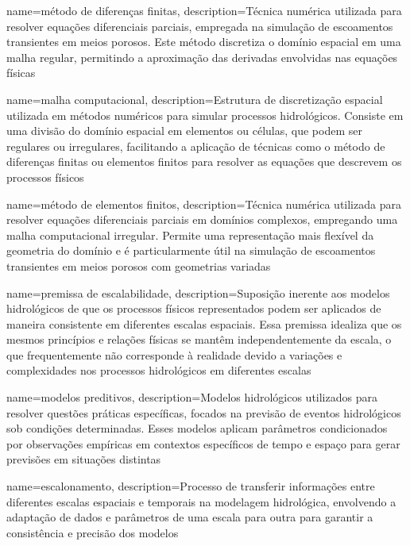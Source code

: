 {
    name=método de diferenças finitas,
    description={Técnica numérica utilizada para resolver equações diferenciais parciais, empregada na simulação de escoamentos transientes em meios porosos. Este método discretiza o domínio espacial em uma malha regular, permitindo a aproximação das derivadas envolvidas nas equações físicas}
}

{
    name=malha computacional,
    description={Estrutura de discretização espacial utilizada em métodos numéricos para simular processos hidrológicos. Consiste em uma divisão do domínio espacial em elementos ou células, que podem ser regulares ou irregulares, facilitando a aplicação de técnicas como o método de diferenças finitas ou elementos finitos para resolver as equações que descrevem os processos físicos}
}

{
    name=método de elementos finitos,
    description={Técnica numérica utilizada para resolver equações diferenciais parciais em domínios complexos, empregando uma malha computacional irregular. Permite uma representação mais flexível da geometria do domínio e é particularmente útil na simulação de escoamentos transientes em meios porosos com geometrias variadas}
}

{
    name=premissa de escalabilidade,
    description={Suposição inerente aos modelos hidrológicos de que os processos físicos representados podem ser aplicados de maneira consistente em diferentes escalas espaciais. Essa premissa idealiza que os mesmos princípios e relações físicas se mantêm independentemente da escala, o que frequentemente não corresponde à realidade devido a variações e complexidades nos processos hidrológicos em diferentes escalas}
}

{
    name=modelos preditivos,
    description={Modelos hidrológicos utilizados para resolver questões práticas específicas, focados na previsão de eventos hidrológicos sob condições determinadas. Esses modelos aplicam parâmetros condicionados por observações empíricas em contextos específicos de tempo e espaço para gerar previsões em situações distintas}
}

{
    name=escalonamento,
    description={Processo de transferir informações entre diferentes escalas espaciais e temporais na modelagem hidrológica, envolvendo a adaptação de dados e parâmetros de uma escala para outra para garantir a consistência e precisão dos modelos}
}

